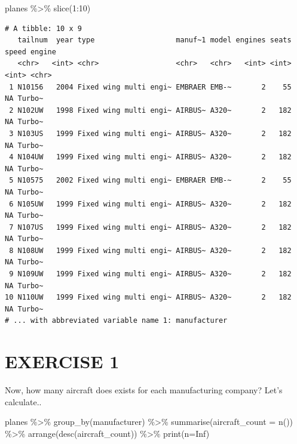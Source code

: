\documentclass[
  letterpaper,
  DIV=11,
  numbers=noendperiod]{scrreprt}
\newenvironment{Shaded}{\begin{snugshade}}{\end{snugshade}}
\newcommand{\AttributeTok}[1]{\textcolor[rgb]{0.40,0.45,0.13}{#1}}
\newcommand{\ConstantTok}[1]{\textcolor[rgb]{0.56,0.35,0.01}{#1}}
\newcommand{\DecValTok}[1]{\textcolor[rgb]{0.68,0.00,0.00}{#1}}
\newcommand{\FunctionTok}[1]{\textcolor[rgb]{0.28,0.35,0.67}{#1}}
\newcommand{\NormalTok}[1]{\textcolor[rgb]{0.00,0.23,0.31}{#1}}
\newcommand{\SpecialCharTok}[1]{\textcolor[rgb]{0.37,0.37,0.37}{#1}}
\begin{document}
\begin{Shaded}
\begin{Highlighting}[]
\NormalTok{planes }\SpecialCharTok{\%\textgreater{}\%} 
  \FunctionTok{slice}\NormalTok{(}\DecValTok{1}\SpecialCharTok{:}\DecValTok{10}\NormalTok{)}
\end{Highlighting}
\end{Shaded}

\begin{verbatim}
# A tibble: 10 x 9
   tailnum  year type                   manuf~1 model engines seats speed engine
   <chr>   <int> <chr>                  <chr>   <chr>   <int> <int> <int> <chr> 
 1 N10156   2004 Fixed wing multi engi~ EMBRAER EMB-~       2    55    NA Turbo~
 2 N102UW   1998 Fixed wing multi engi~ AIRBUS~ A320~       2   182    NA Turbo~
 3 N103US   1999 Fixed wing multi engi~ AIRBUS~ A320~       2   182    NA Turbo~
 4 N104UW   1999 Fixed wing multi engi~ AIRBUS~ A320~       2   182    NA Turbo~
 5 N10575   2002 Fixed wing multi engi~ EMBRAER EMB-~       2    55    NA Turbo~
 6 N105UW   1999 Fixed wing multi engi~ AIRBUS~ A320~       2   182    NA Turbo~
 7 N107US   1999 Fixed wing multi engi~ AIRBUS~ A320~       2   182    NA Turbo~
 8 N108UW   1999 Fixed wing multi engi~ AIRBUS~ A320~       2   182    NA Turbo~
 9 N109UW   1999 Fixed wing multi engi~ AIRBUS~ A320~       2   182    NA Turbo~
10 N110UW   1999 Fixed wing multi engi~ AIRBUS~ A320~       2   182    NA Turbo~
# ... with abbreviated variable name 1: manufacturer
\end{verbatim}

\hypertarget{exercise-1}{%
\section{EXERCISE 1}\label{exercise-1}}

Now, how many aircraft does exists for each manufacturing company? Let's
calculate..

\begin{Shaded}
\begin{Highlighting}[]
\NormalTok{planes }\SpecialCharTok{\%\textgreater{}\%} 
  \FunctionTok{group\_by}\NormalTok{(manufacturer) }\SpecialCharTok{\%\textgreater{}\%} 
  \FunctionTok{summarise}\NormalTok{(}\AttributeTok{aircraft\_count =} \FunctionTok{n}\NormalTok{()) }\SpecialCharTok{\%\textgreater{}\%} 
  \FunctionTok{arrange}\NormalTok{(}\FunctionTok{desc}\NormalTok{(aircraft\_count)) }\SpecialCharTok{\%\textgreater{}\%} 
  \FunctionTok{print}\NormalTok{(}\AttributeTok{n=}\ConstantTok{Inf}\NormalTok{)}
\end{Highlighting}
\end{Shaded}
\end{document}
